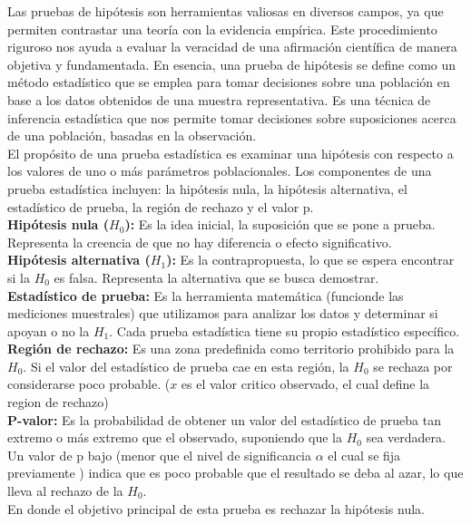 Las pruebas de hipótesis son herramientas valiosas en diversos campos, ya que permiten contrastar una teoría con la evidencia empírica. Este procedimiento riguroso nos ayuda a evaluar la veracidad de una afirmación científica de manera objetiva y fundamentada. En esencia, una prueba de hipótesis se define como un método estadístico que se emplea para tomar decisiones sobre una población en base a los datos obtenidos de una muestra representativa. Es una técnica de inferencia estadística que nos permite tomar decisiones sobre suposiciones acerca de una población, basadas en la observación.\\

El propósito de una prueba estadística es examinar una hipótesis con respecto a los valores de uno o más parámetros poblacionales. Los componentes de una prueba estadística incluyen: la hipótesis nula, la hipótesis alternativa, el estadístico de prueba, la región de rechazo y el valor p. \\
\textbf{Hipótesis nula ($H_0$):} Es la idea inicial, la suposición que se pone a prueba. Representa la creencia de que no hay diferencia o efecto significativo.\\
\textbf{Hipótesis alternativa ($H_1$): }Es la contrapropuesta, lo que se espera encontrar si la $H_0$ es falsa. Representa la alternativa que se busca demostrar.\\
\textbf{Estadístico de prueba: }Es la herramienta matemática (funcionde las mediciones muestrales) que utilizamos para analizar los datos y determinar si apoyan o no la $H_1$. Cada prueba estadística tiene su propio estadístico específico.\\
\textbf{Región de rechazo: }Es una zona predefinida como territorio prohibido para la $H_0$. Si el valor del estadístico de prueba cae en esta región, la $H_0$ se rechaza por considerarse poco probable. ($x$ es el valor critico observado, el cual define la region de rechazo)\\
\textbf{ P-valor:} Es la probabilidad de obtener un valor del estadístico de prueba tan extremo o más extremo que el observado, suponiendo que la $H_0$ sea verdadera. Un valor de p bajo (menor que el nivel de significancia $\alpha $  el cual se fija previamente  ) indica que es poco probable que el resultado se deba al azar, lo que lleva al rechazo de la $H_0$.\\

En donde el objetivo principal de esta prueba es rechazar la hipótesis nula.\\

